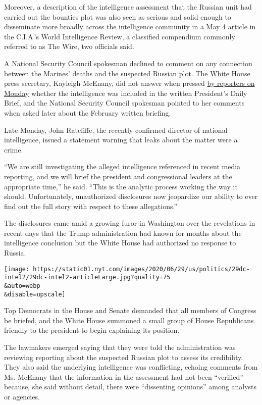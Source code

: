 Moreover, a description of the intelligence assessment that the Russian
unit had carried out the bounties plot was also seen as serious and
solid enough to disseminate more broadly across the intelligence
community in a May 4 article in the C.I.A.'s World Intelligence Review,
a classified compendium commonly referred to as The Wire, two officials
said.

A National Security Council spokesman declined to comment on any
connection between the Marines' deaths and the suspected Russian plot.
The White House press secretary, Kayleigh McEnany, did not answer when
pressed
\href{https://www.whitehouse.gov/briefings-statements/press-briefing-press-secretary-kayleigh-mcenany-062920/}{by
reporters on Monday} whether the intelligence was included in the
written President's Daily Brief, and the National Security Council
spokesman pointed to her comments when asked later about the February
written briefing.

Late Monday, John Ratcliffe, the recently confirmed director of national
intelligence, issued a statement warning that leaks about the matter
were a crime.

``We are still investigating the alleged intelligence referenced in
recent media reporting, and we will brief the president and
congressional leaders at the appropriate time,'' he said. ``This is the
analytic process working the way it should. Unfortunately, unauthorized
disclosures now jeopardize our ability to ever find out the full story
with respect to these allegations.''

The disclosures came amid a growing furor in Washington over the
revelations in recent days that the Trump administration had known for
months about the intelligence conclusion but the White House had
authorized no response to Russia.

\texttt{[image: https://static01.nyt.com/images/2020/06/29/us/politics/29dc-intel2/29dc-intel2-articleLarge.jpg?quality=75\\\&auto=webp\\\&disable=upscale]}

Top Democrats in the House and Senate demanded that all members of
Congress be briefed, and the White House summoned a small group of House
Republicans friendly to the president to begin explaining its position.

The lawmakers emerged saying that they were told the administration was
reviewing reporting about the suspected Russian plot to assess its
credibility. They also said the underlying intelligence was conflicting,
echoing comments from Ms. McEnany that the information in the assessment
had not been ``verified'' because, she said without detail, there were
``dissenting opinions'' among analysts or agencies.

